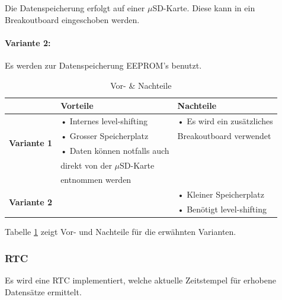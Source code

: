 Die Datenspeicherung erfolgt auf einer $\mu$SD-Karte. Diese kann in ein Breakoutboard eingeschoben werden.\\

\paragraph{Variante 2:}

Es werden zur Datenspeicherung EEPROM's benutzt.\\

\begin{table}[h]
  \centering
  \label{tab:datenspeicherung}
  \small
  \caption{Vor- \& Nachteile}
    \begin{tabular}{c|l|l}
          & \textbf{Vorteile} & \textbf{Nachteile} \\
    \toprule
    \multirow{4}[2]{*}{\textbf{Variante 1}} & • Internes level-shifting & • Es wird ein zusätzliches \\
          & • Grosser Speicherplatz & \hspace{0.3cm}Breakoutboard verwendet \\
          & • Daten können notfalls auch &  \\
          &   \hspace{0.3cm} direkt von der $\mu$SD-Karte &  \\
          &   \hspace{0.3cm} entnommen werden &  \\
    \hline
    \multirow{2}[1]{*}{\textbf{Variante 2}} &       & • Kleiner Speicherplatz \\
          &       & • Benötigt level-shifting \\
    \end{tabular}%
  \label{tab:Datenspeicherung}%
\end{table}%

Tabelle \ref{tab:Datenspeicherung} zeigt Vor- und Nachteile für die erwähnten Varianten.\\

\subsubsection{RTC}
Es wird eine RTC implementiert, welche aktuelle Zeitstempel für erhobene Datensätze ermittelt.\\

